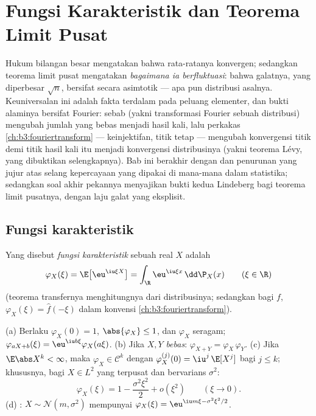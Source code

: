 \chapter{Fungsi Karakteristik dan Teorema Limit
Pusat}\label{ch:b3:clt}

Hukum bilangan besar mengatakan bahwa rata-ratanya konvergen; sedangkan teorema
limit pusat mengatakan \emph{bagaimana ia berfluktuasi}: bahwa galatnya,
yang diperbesar $\sqrt n$, bersifat  secara asimtotik ---
apa pun distribusi asalnya. Keuniversalan ini adalah
fakta terdalam pada peluang elementer, dan bukti alaminya
bersifat Fourier: sebab \emph{}
(yakni transformasi Fourier sebuah distribusi) mengubah jumlah yang bebas
menjadi hasil kali, lalu perkakas \cref{ch:b3:fouriertransform}
--- keinjektifan, titik tetap  --- mengubah konvergensi
titik demi titik hasil kali itu menjadi konvergensi distribusinya
(yakni teorema Lévy, yang dibuktikan selengkapnya). Bab ini berakhir dengan
 dan penurunan yang jujur atas selang
kepercayaan yang dipakai di mana-mana dalam statistika; sedangkan soal akhir pekannya
menyajikan bukti kedua Lindeberg bagi teorema limit pusatnya, dengan laju
galat yang eksplisit.

\section{Fungsi karakteristik}

\begin{definition}\label{def:b3:clt:cf}
Yang disebut \emph{fungsi karakteristik} sebuah  real $X$ adalah
\[
\varphi_X(\xi) = \E\bigl[\eu^{\iu\xi X}\bigr]
= \int_\R \eu^{\iu\xi x}\,\dd\P_X(x)
\qquad (\xi \in \R)
\]
(teorema transfernya menghitungnya dari distribusinya; sedangkan bagi 
$f$, $\varphi_X(\xi) = \hat f(-\xi)$ dalam
konvensi \cref{ch:b3:fouriertransform}).
\end{definition}

\begin{proposition}\label{prop:b3:clt:cfbasics}
(a) Berlaku $\varphi_X(0) = 1$, $\abs{\varphi_X} \leq 1$, dan
$\varphi_X$  seragam;
$\varphi_{aX + b}(\xi) = \eu^{\iu b\xi}\varphi_X(a\xi)$.
(b) Jika $X, Y$ \emph{bebas}:
$\varphi_{X+Y} = \varphi_X\,\varphi_Y$.
(c) Jika $\E\abs X^k < \infty$, maka $\varphi_X \in \mathcal
C^k$ dengan $\varphi_X^{(j)}(0) = \iu^j\,\E[X^j]$ bagi $j \leq
k$; khususnya, bagi $X \in L^2$ yang terpusat dan bervarians
$\sigma^2$:
\[
\varphi_X(\xi) = 1 - \frac{\sigma^2\xi^2}{2} +
o(\xi^2) \qquad (\xi \to 0).
\]
(d) : $X \sim \mathcal N(m, \sigma^2)$ mempunyai
$\varphi_X(\xi) = \eu^{\iu m\xi - \sigma^2\xi^2/2}$.
\end{proposition}

